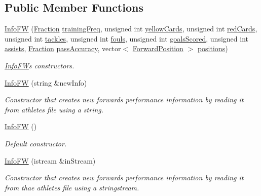 \subsection*{Public Member Functions}
\begin{DoxyCompactItemize}
\item 
\hyperlink{class_info_f_w_a03c85ce3609ac34d37f0afee1e4a67c6}{Info\+FW} (\hyperlink{class_fraction}{Fraction} \hyperlink{class_info_ae893be5aad319de5d911c3f80cc0a2d4}{training\+Freq}, unsigned int \hyperlink{class_info_aabdfdb282f3ceaae1772574bf2b3cd86}{yellow\+Cards}, unsigned int \hyperlink{class_info_a953c30accc7e6ff301542adfd5824f38}{red\+Cards}, unsigned int \hyperlink{class_info_aecdd57d96490b16a0c2590dd8f34009e}{tackles}, unsigned int \hyperlink{class_info_a2f90c84ba67c0e225dd58cdc14ab7f3d}{fouls}, unsigned int \hyperlink{class_info_a5ad5f72833856502b9c1f6ea50a98619}{goals\+Scored}, unsigned int \hyperlink{class_info_a1c0340af11df3407946b0ffdaae28864}{assists}, \hyperlink{class_fraction}{Fraction} \hyperlink{class_info_a37ee53dc8ae9a9656206e7eb389c6392}{pass\+Accuracy}, vector$<$ \hyperlink{_utils_8hpp_ae6ffae6f01bd3312aac4a44642f14620}{Forward\+Position} $>$ \hyperlink{class_info_f_w_ab6a247d57fee089e4a7ad08e798c101b}{positions})
\begin{DoxyCompactList}\small\item\em \hyperlink{class_info_f_w}{Info\+FW}\textquotesingle{}s constructors. \end{DoxyCompactList}\item 
\hyperlink{class_info_f_w_ad4b4d077d84d8943bb1bccf8a9679e63}{Info\+FW} (string \&new\+Info)
\begin{DoxyCompactList}\small\item\em Constructor that creates new forward\textquotesingle{}s performance information by reading it from athletes file using a string. \end{DoxyCompactList}\item 
\hyperlink{class_info_f_w_aa45a6024762145dffd2c6c82648bc2ea}{Info\+FW} ()
\begin{DoxyCompactList}\small\item\em Default constructor. \end{DoxyCompactList}\item 
\hyperlink{class_info_f_w_a2d29763451213dd0f92fee314e3ff2e9}{Info\+FW} (istream \&in\+Stream)
\begin{DoxyCompactList}\small\item\em Constructor that creates new forward\textquotesingle{}s performance information by reading it from thae athletes file using a stringstream. \end{DoxyCompactList}\item 

\end{DoxyCompactItemize}

